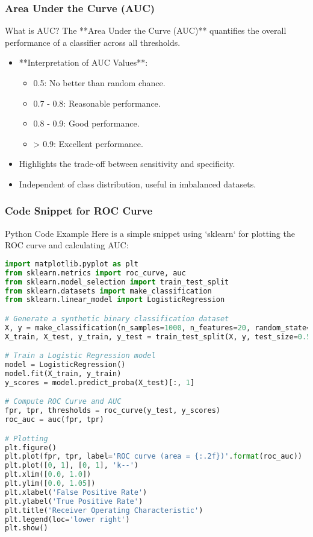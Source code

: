 \documentclass[aspectratio=169]{beamer}
\begin{document}
\begin{frame}[fragile]
    \frametitle{Area Under the Curve (AUC)}
    \begin{block}{What is AUC?}
        The **Area Under the Curve (AUC)** quantifies the overall performance of a classifier across all thresholds.
    \end{block}
    \begin{itemize}
        \item **Interpretation of AUC Values**:
            \begin{itemize}
                \item 0.5: No better than random chance.
                \item 0.7 - 0.8: Reasonable performance.
                \item 0.8 - 0.9: Good performance.
                \item > 0.9: Excellent performance.
            \end{itemize}
        \item Highlights the trade-off between sensitivity and specificity.
        \item Independent of class distribution, useful in imbalanced datasets.
    \end{itemize}
\end{frame}

\begin{frame}[fragile]
    \frametitle{Code Snippet for ROC Curve}
    \begin{block}{Python Code Example}
        Here is a simple snippet using `sklearn` for plotting the ROC curve and calculating AUC:
    \end{block}
    \begin{lstlisting}[language=Python]
import matplotlib.pyplot as plt
from sklearn.metrics import roc_curve, auc
from sklearn.model_selection import train_test_split
from sklearn.datasets import make_classification
from sklearn.linear_model import LogisticRegression

# Generate a synthetic binary classification dataset
X, y = make_classification(n_samples=1000, n_features=20, random_state=42)
X_train, X_test, y_train, y_test = train_test_split(X, y, test_size=0.5, random_state=42)

# Train a Logistic Regression model
model = LogisticRegression()
model.fit(X_train, y_train)
y_scores = model.predict_proba(X_test)[:, 1]

# Compute ROC Curve and AUC
fpr, tpr, thresholds = roc_curve(y_test, y_scores)
roc_auc = auc(fpr, tpr)

# Plotting
plt.figure()
plt.plot(fpr, tpr, label='ROC curve (area = {:.2f})'.format(roc_auc))
plt.plot([0, 1], [0, 1], 'k--')
plt.xlim([0.0, 1.0])
plt.ylim([0.0, 1.05])
plt.xlabel('False Positive Rate')
plt.ylabel('True Positive Rate')
plt.title('Receiver Operating Characteristic')
plt.legend(loc='lower right')
plt.show()
    \end{lstlisting}
\end{frame}
\end{document}
